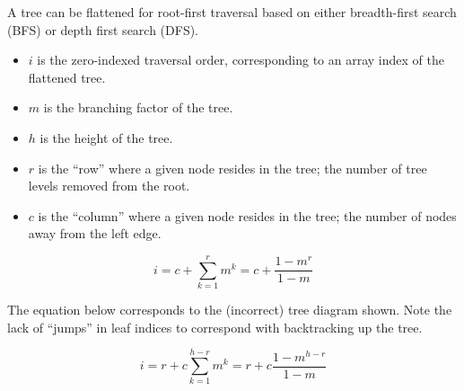 \appendix



A tree can be flattened for root-first traversal based on either breadth-first
search (BFS) or depth first search (DFS).

\begin{itemize}
	\item $i$ is the zero-indexed traversal order, corresponding to an array
	index of the flattened tree.
	\item $m$ is the branching factor of the tree.
	\item $h$ is the height of the tree.
	\item $r$ is the ``row'' where a given node resides in the tree;
	the number of tree levels removed from the root.
	\item $c$ is the ``column'' where a given node resides  in the tree;
	the number of nodes away from the left edge.
\end{itemize}



$$
	i = c + \sum_{k=1}^r m^k
	= c + \frac{1 - m^r}{1 - m}
$$


\begin{figure}[H]
	\centering
\end{figure}



The equation below corresponds to the (incorrect) tree diagram shown. Note the
lack of ``jumps'' in leaf indices to correspond with backtracking up the tree.

$$
	i = r + c\sum_{k=1}^{h-r} m^k = r + c\frac{1 - m^{h-r}}{1 - m}
$$

